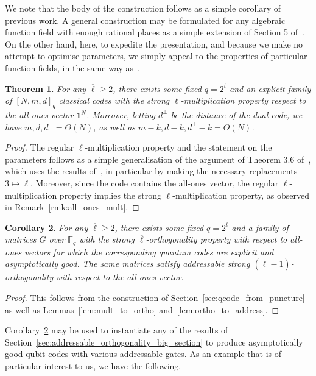 \documentclass[11pt]{article}
\newtheorem{theorem}{Theorem}[section]
\newtheorem{corollary}[theorem]{Corollary}
\theoremstyle{definition}
\renewcommand{\geq}{\geqslant}
\newcommand*{\ol}{\overline}
\begin{document}
We note that the body of the construction follows as a simple corollary of previous work. A general construction may be formulated for any algebraic function field with enough rational places as a simple extension of Section 5 of~\cite{wills2024constant}. On the other hand, here, to expedite the presentation, and because we make no attempt to optimise parameters, we simply appeal to the properties of particular function fields, in the same way as~\cite{nguyen2024goodbinaryquantumcodes}.
\begin{theorem}\label{thm:AG_instantiation_matrix}
    For any $\ol\ell \geq 2$, there exists some fixed $q=2^t$ and an explicit family of $[N,m,d]_q$ classical codes with the strong $\ol\ell$-multiplication property respect to the all-ones vector $\mathbf{1}^N$. Moreover, letting $d^\perp$ be the distance of the dual code, we have $m,d,d^\perp = \Theta(N)$, as well as $m-k, d-k, d^\perp-k = \Theta(N)$.
\end{theorem}
\begin{proof}
    The regular $\ol\ell$-multiplication property and the statement on the parameters follows as a simple generalisation of the argument of Theorem 3.6 of~\cite{nguyen2024goodbinaryquantumcodes}, which uses the results of~\cite{garcia1995tower,stichtenoth2009algebraic}, in particular by making the necessary replacements $3 \mapsto \ol\ell$. Moreover, since the code contains the all-ones vector, the regular $\ol\ell$-multiplication property implies the strong $\ol\ell$-multiplication property, as observed in Remark~\ref{rmk:all_ones_mult}.
\end{proof}
\begin{corollary}\label{cor:AG_instantiation_code}
    For any $\ol\ell \geq 2$, there exists some fixed $q=2^t$ and a family of matrices $G$ over $\mathbb{F}_q$ with the strong $\ol\ell$-orthogonality property with respect to all-ones vectors for which the corresponding quantum codes are explicit and asymptotically good. The same matrices satisfy addressable strong $(\ol\ell-1)$-orthogonality with respect to the all-ones vector.
\end{corollary}
\begin{proof}
    This follows from the construction of Section~\ref{sec:qcode_from_puncture} as well as Lemmas~\ref{lem:mult_to_ortho} and~\ref{lem:ortho_to_address}.
\end{proof}
Corollary~\ref{cor:AG_instantiation_code} may be used to instantiate any of the results of Section~\ref{sec:addressable_orthogonality_big_section} to produce asymptotically good qubit codes with various addressable gates. As an example that is of particular interest to us, we have the following.
\end{document}
